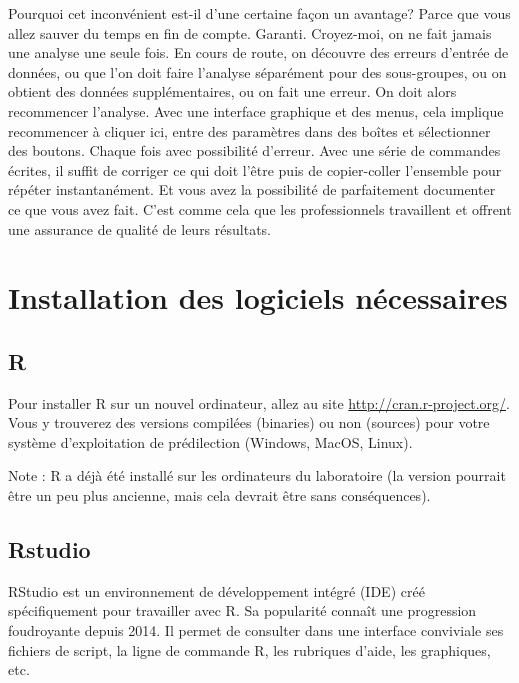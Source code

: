 \documentclass[12pt,]{book}
\begin{document}
Pourquoi cet inconvénient est-il d'une certaine façon un avantage? Parce que vous allez sauver du temps en fin de compte.
Garanti.
Croyez-moi, on ne fait jamais une analyse une seule fois.
En cours de route, on découvre des erreurs d'entrée de données, ou que l'on doit faire l'analyse séparément pour des sous-groupes, ou on obtient des données supplémentaires, ou on fait une erreur.
On doit alors recommencer l'analyse.
Avec une interface graphique et des menus, cela implique recommencer à cliquer ici, entre des paramètres dans des boîtes et sélectionner des boutons.
Chaque fois avec possibilité d'erreur.
Avec une série de commandes écrites, il suffit de corriger ce qui doit l'être puis de copier-coller l'ensemble pour répéter instantanément.
Et vous avez la possibilité de parfaitement documenter ce que vous avez fait.
C'est comme cela que les professionnels travaillent et offrent une assurance de qualité de leurs résultats.

\hypertarget{installation-des-logiciels-nuxe9cessaires}{%
\section*{Installation des logiciels nécessaires}\label{installation-des-logiciels-nuxe9cessaires}}


\hypertarget{r}{%
\subsection*{R}\label{r}}


Pour installer R sur un nouvel ordinateur, allez au site \url{http://cran.r-project.org/}.
Vous y trouverez des versions compilées (binaries) ou non (sources) pour votre système d'exploitation de prédilection (Windows, MacOS, Linux).

Note : R a déjà été installé sur les ordinateurs du laboratoire (la version pourrait être un peu plus ancienne, mais cela devrait être sans conséquences).

\hypertarget{rstudio}{%
\subsection*{Rstudio}\label{rstudio}}


RStudio est un environnement de développement intégré (IDE) créé spécifiquement pour travailler avec R. Sa popularité connaît une progression foudroyante depuis 2014.
Il permet de consulter dans une interface conviviale ses fichiers de script, la ligne de commande R, les rubriques d'aide,
les graphiques, etc.
\end{document}
